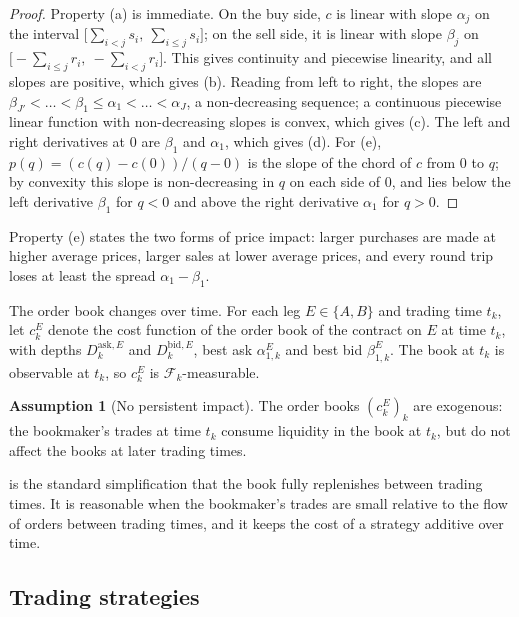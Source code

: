 \documentclass[11pt,a4paper]{article}
\theoremstyle{plain}
\theoremstyle{definition}
\newtheorem{assumption}[theorem]{Assumption}
\theoremstyle{remark}
\newcommand{\1}{\mathbf{1}}
\newcommand{\F}{\mathcal{F}}
\begin{document}
\begin{proof}
Property (a) is immediate. On the buy side, $c$ is linear with slope $\alpha_j$ on the interval $\bigl[\sum_{i<j}s_i,\ \sum_{i\leq j}s_i\bigr]$; on the sell side, it is linear with slope $\beta_j$ on $\bigl[-\sum_{i\leq j}r_i,\ -\sum_{i<j}r_i\bigr]$. This gives continuity and piecewise linearity, and all slopes are positive, which gives (b). Reading from left to right, the slopes are $\beta_{J'}<\dots<\beta_1\leq\alpha_1<\dots<\alpha_J$, a non-decreasing sequence; a continuous piecewise linear function with non-decreasing slopes is convex, which gives (c). The left and right derivatives at $0$ are $\beta_1$ and $\alpha_1$, which gives (d). For (e), $p(q) = (c(q)-c(0))/(q-0)$ is the slope of the chord of $c$ from $0$ to $q$; by convexity this slope is non-decreasing in $q$ on each side of $0$, and lies below the left derivative $\beta_1$ for $q<0$ and above the right derivative $\alpha_1$ for $q>0$.
\end{proof}

Property (e) states the two forms of price impact: larger purchases are made at higher average prices, larger sales at lower average prices, and every round trip loses at least the spread $\alpha_1-\beta_1$.

The order book changes over time. For each leg $E\in\{A,B\}$ and trading time $t_k$, let $c^E_k$ denote the cost function of the order book of the contract on $E$ at time $t_k$, with depths $D^{\mathrm{ask},E}_k$ and $D^{\mathrm{bid},E}_k$, best ask $\alpha^E_{1,k}$ and best bid $\beta^E_{1,k}$. The book at $t_k$ is observable at $t_k$, so $c^E_k$ is $\F_k$-measurable.

\begin{assumption}[No persistent impact]
\label{ass:impact}
The order books $(c^E_k)_{k}$ are exogenous: the bookmaker's trades at time $t_k$ consume liquidity in the book at $t_k$, but do not affect the books at later trading times.
\end{assumption}

 is the standard simplification that the book fully replenishes between trading times. It is reasonable when the bookmaker's trades are small relative to the flow of orders between trading times, and it keeps the cost of a strategy additive over time.

\subsection{Trading strategies}
\end{document}
